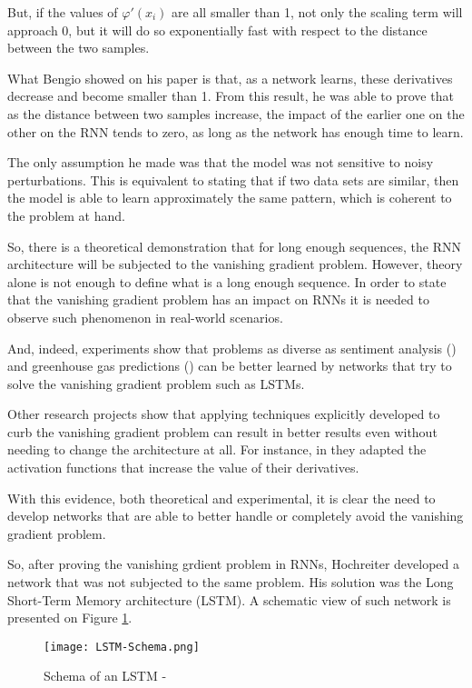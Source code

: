 But, if the values of $\varphi'(x_i)$ are all smaller than 1, not only the scaling term will approach 0, but it will do so exponentially fast with respect to the distance between the two samples.

What Bengio showed on his paper \cite{bengio1993problem} is that, as a network learns, these derivatives decrease and become smaller than 1.
From this result, he was able to prove that as the distance between two samples increase, the impact of the earlier one on the other on the RNN tends to zero, as long as the network has enough time to learn.

The only assumption he made was that the model was not sensitive to noisy perturbations.
This is equivalent to stating that if two data sets are similar, then the model is able to learn approximately the same pattern, which is coherent to the problem at hand.

So, there is a theoretical demonstration that for long enough sequences, the RNN architecture will be subjected to the vanishing gradient problem.
However, theory alone is not enough to define what is a long enough sequence.
In order to state that the vanishing gradient problem has an impact on RNNs it is needed to observe such phenomenon in real-world scenarios. 

And, indeed, experiments show that problems as diverse as sentiment analysis (\cite{raza2021cloud}) and greenhouse gas predictions (\cite{ludwig2019comparison}) can be better learned by networks that try to solve the vanishing gradient problem such as LSTMs.

Other research projects show that applying techniques explicitly developed to curb the vanishing gradient problem can result in better results even without needing to change the architecture at all.
For instance, in \cite{hu2021handling} they adapted the activation functions that increase the value of their derivatives.

With this evidence, both theoretical and experimental, it is clear the need to develop networks that are able to better handle or completely avoid the vanishing gradient problem.

So, after proving the vanishing grdient problem in RNNs, Hochreiter developed a network that was not subjected to the same problem.
His solution was the Long Short-Term Memory architecture (LSTM).
A schematic view of such network is presented on Figure \ref{fig:LSTMSchema}.

\begin{figure}
    \begin{center}
        \texttt{[image: LSTM-Schema.png]}
        \caption[Schema of an LSTM]{Schema of an LSTM - \cite{rahman2019nonintrusive}}
        \label{fig:LSTMSchema}
    \end{center}
\end{figure}

